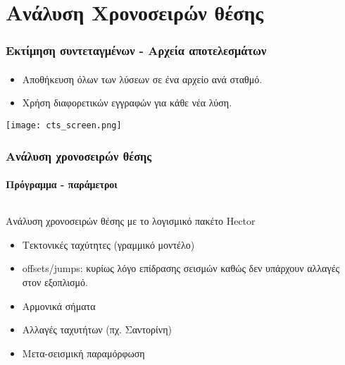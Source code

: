 \section{Ανάλυση Χρονοσειρών θέσης}
 
\graphicspath{{Chapter2/Figs/}}

\begin{frame}
  \frametitle{Εκτίμηση συντεταγμένων - Αρχεία αποτελεσμάτων}
  \framesubtitle{}
  \label{}
  \begin{itemize}\setlength\itemsep{1em}
    \item Αποθήκευση όλων των λύσεων σε ένα αρχείο ανά σταθμό.
    \item Χρήση διαφορετικών εγγραφών για κάθε νέα λύση.
  \end{itemize}
  \begin{center}
    \texttt{[image: cts\_screen.png]}
  \end{center}
\end{frame}
\note{}

\begin{frame}
  \frametitle{Ανάλυση χρονοσειρών θέσης}
  \framesubtitle{Πρόγραμμα - παράμετροι}
  \label{}
  \begin{columns}[T]
    \begin{column}{.5\textwidth}
      Ανάλυση χρονοσειρών θέσης με το λογισμικό πακέτο Hector \citep{Bos2012}
      \begin{itemize}\setlength\itemsep{1em}
        \item Τεκτονικές ταχύτητες (γραμμικό μοντέλο)
        \item offsets/jumps: κυρίως λόγο επίδρασης σεισμών καθώς δεν υπάρχουν αλλαγές στον εξοπλισμό.
        \item Αρμονικά σήματα
        \item Αλλαγές ταχυτήτων (πχ. Σαντορίνη)
        \item Μετα-σεισμική παραμόρφωση
      \end{itemize}
    \end{column}
  \end{columns}
\end{frame}
\note{}


